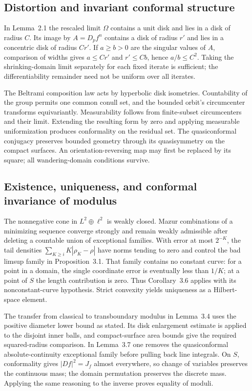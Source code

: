 \documentclass[10pt]{article}
\begin{document}
\subsection*{Distortion and invariant conformal structure}
In Lemma 2.1 the rescaled limit \(\Omega\) contains a unit disk and lies in a disk of radius \(C\). Its image by \(A=D_pf^n\) contains a disk of radius \(r'\) and lies in a concentric disk of radius \(Cr'\). If \(a\ge b>0\) are the singular values of \(A\), comparison of widths gives \(a\le Cr'\) and \(r'\le Cb\), hence \(a/b\le C^2\). Taking the shrinking-domain limit separately for each fixed iterate is sufficient; the differentiability remainder need not be uniform over all iterates.\par
The Beltrami composition law acts by hyperbolic disk isometries. Countability of the group permits one common conull set, and the bounded orbit’s circumcenter transforms equivariantly. Measurability follows from finite-subset circumcenters and their limit. Extending the resulting form by zero and applying measurable uniformization produces conformality on the residual set. The quasiconformal conjugacy preserves bounded geometry through its quasisymmetry on the compact surfaces. An orientation-reversing map may first be replaced by its square; all wandering-domain conditions survive.\par
\subsection*{Existence, uniqueness, and conformal invariance of modulus}
The nonnegative cone in \(L^2\oplus\ell^2\) is weakly closed. Mazur combinations of a minimizing sequence converge strongly and remain weakly admissible after deleting a countable union of exceptional families. With error at most \(2^{-K}\), the tail densities \(\sum_{K\ge i}K|\rho_K-\rho|\) have norms tending to zero and control the bad limsup family in Proposition 3.1. That family contains no constant curve: for a point in a domain, the single coordinate error is eventually less than \(1/K\); at a point of \(S\) the length contribution is zero. Thus Corollary 3.6 applies with its nonconstant-curve hypothesis. Strict convexity yields uniqueness as a Hilbert-space element.\par
The transfer from classical to transboundary modulus in Lemma 3.4 uses the positive diameter lower bound as stated. Its disk enlargement estimate is applied to the disjoint inner balls, and compact-surface area bounds give the required squared-radius comparison. In Lemma 3.7 one removes the quasiconformal absolute-continuity exceptional family before pulling back line integrals. On \(S\), conformality gives \(|Df|^2=J_f\) almost everywhere, so change of variables preserves the continuous mass; the domain permutation preserves the discrete mass. Applying the same reasoning to the inverse proves equality of moduli.\par
\end{document}
